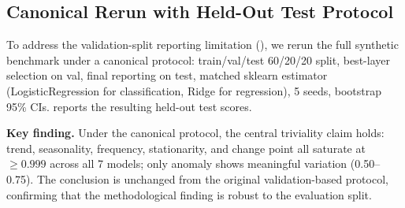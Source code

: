 \documentclass{article}
\begin{document}
\subsection{Canonical Rerun with Held-Out Test Protocol}
\label{sec:canonical_rerun}

To address the validation-split reporting limitation (), we rerun the full synthetic benchmark under a canonical protocol: train/val/test 60/20/20 split, best-layer selection on val, final reporting on test, matched sklearn estimator (LogisticRegression for classification, Ridge for regression), 5 seeds, bootstrap 95\% CIs.  reports the resulting held-out test scores.

\begin{table}[tbp]
\caption{Canonical rerun: best-layer test accuracy (or R\textsuperscript{2} for seasonality) under train/val/test 60/20/20, matched estimator, 5 seeds, bootstrap 95\% CI. \emph{Confirmatory benchmark result.}}
\label{tab:canonical_rerun}
\centering
{}
\end{table}

\textbf{Key finding.} Under the canonical protocol, the central triviality claim holds: trend, seasonality, frequency, stationarity, and change point all saturate at $\geq 0.999$ across all 7 models; only anomaly shows meaningful variation (0.50--0.75). The conclusion is unchanged from the original validation-based protocol, confirming that the methodological finding is robust to the evaluation split.
\end{document}
